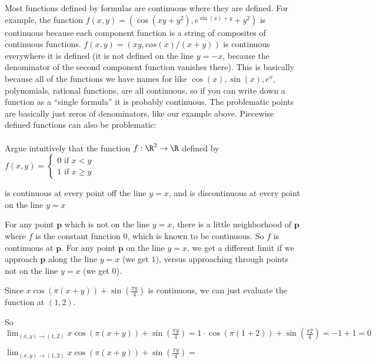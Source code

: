 \documentclass{ximera}
\begin{document}
	Most functions defined by formulas are continuous where they are defined.  For example, the function
	$f(x,y) = (\cos(xy+y^2),e^{\sin(x)+y}+y^2)$ is continuous because each component function is a string of composites of continuous functions. 
	$f(x,y) = (xy,cos(x)/(x+y))$ is continuous everywhere it is defined (it is not defined on the line $y=-x$, because the denominator of the 
	second component function vanishes there).  This is basically because all of the functions we have names for like $\cos(x),\sin(x), e^x$, polynomials, 
	rational functions, are all continuous, so if you can write down a function as a ``single formula'' it is probably continuous. 
	The problematic points are basically just zeros of denominators, like our example above.  Piecewise defined functions can also be problematic:
	\\
	\\
		Argue intuitively that the function $f:\R^2 \to \R$ defined by 
			\(f(x,y) = \begin{cases}
			0  \text{ if $x<y$}\\
			1  \text{ if $x\geq y$}
			\end{cases}\)
			
			is continuous at every point off the line $y=x$, and is discontinuous at every point on the line $y=x$
\begin{free-response}
	For any point $\mathbf{p}$ which is not on the line $y=x$, there is a little neighborhood of $\mathbf{p}$ where $f$ is the constant function $0$,
	 which is known to be  continuous.  So $f$ is continuous at $\mathbf{p}$.  For any point $\mathbf{p}$ on the line $y=x$, we get a different limit if we approach 
	 $\mathbf{p}$ along the line $y=x$ (we get $1$), versus approaching through points not on the line $y=x$ (we get $0$).
\end{free-response}
	
	\begin{question}
		\begin{solution}
		\begin{hint}
			Since $x\cos(\pi (x+y)) + \sin(\frac{\pi y}{4})$ is continuous, we can just evaluate the function at $(1,2)$.
		\end{hint}
		\begin{hint}
			So $\displaystyle\lim_{(x,y) \to (1,2)} x\cos(\pi (x+y)) + \sin(\frac{\pi y}{4}) = 1 \cdot \cos(\pi(1+2))+\sin(\frac{\pi 2}{4}) = -1+1=0$
		\end{hint}
		$\lim_{(x,y) \to (1,2)} x\cos(\pi (x+y)) + \sin(\frac{\pi y}{4}) =$ 
		\end{solution}
	\end{question}
	
\end{document}
